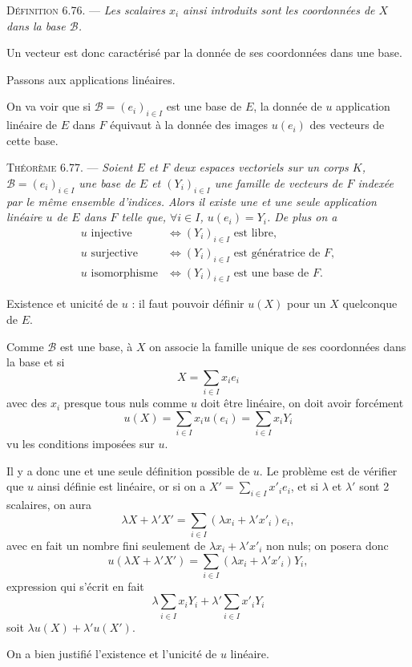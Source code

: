 \medskip\noindent\textsc{Définition 6.76.} --- \emph{Les scalaires $x_i$ ainsi introduits sont les coordonnées de $X$ dans la base $\mathcal B$.}

Un vecteur est donc caractérisé par la donnée de ses coordonnées dans une base.

Passons aux applications linéaires.

On va voir que si $\mathcal B=(e_i)_{i\in I}$ est une base de $E$, la donnée de $u$ application linéaire de $E$ dans $F$ équivaut à la donnée des images $u(e_i)$ des vecteurs de cette base.

\medskip\noindent\textsc{Théorème 6.77.} --- \emph{Soient $E$ et $F$ deux espaces vectoriels sur un corps $K$, $\mathcal B=(e_i)_{i\in I}$ une base de $E$ et $(Y_i)_{i\in I}$ une famille de vecteurs de $F$ indexée par le même ensemble d'indices. Alors il existe une et une seule application linéaire $u$ de $E$ dans $F$ telle que, $\forall i\in I$, $u(e_i)=Y_i$. De plus on a
\[
\begin{aligned}
u\text{ injective}&\Longleftrightarrow (Y_i)_{i\in I}\text{ est libre},\\
u\text{ surjective}&\Longleftrightarrow (Y_i)_{i\in I}\text{ est génératrice de }F,\\
u\text{ isomorphisme}&\Longleftrightarrow (Y_i)_{i\in I}\text{ est une base de }F.
\end{aligned}
\]}

Existence et unicité de $u$ : il faut pouvoir définir $u(X)$ pour un $X$ quelconque de $E$.

Comme $\mathcal B$ est une base, à $X$ on associe la famille unique de ses coordonnées dans la base et si
\[
X=\sum_{i\in I}x_i e_i
\]
avec des $x_i$ presque tous nuls comme $u$ doit être linéaire, on doit avoir forcément
\[
u(X)=\sum_{i\in I}x_i u(e_i)=\sum_{i\in I}x_iY_i
\]
vu les conditions imposées sur $u$.

Il y a donc une et une seule définition possible de $u$. Le problème est de vérifier que $u$ ainsi définie est linéaire, or si on a $X'=\sum_{i\in I}x'_i e_i$, et si $\lambda$ et $\lambda'$ sont 2 scalaires, on aura
\[
\lambda X+\lambda'X'=\sum_{i\in I}(\lambda x_i+\lambda' x'_i)e_i,
\]
avec en fait un nombre fini seulement de $\lambda x_i+\lambda' x'_i$ non nuls; on posera donc
\[
u(\lambda X+\lambda'X')=\sum_{i\in I}(\lambda x_i+\lambda' x'_i)Y_i,
\]
expression qui s'écrit en fait
\[
\lambda\sum_{i\in I}x_iY_i+\lambda'\sum_{i\in I}x'_iY_i
\]
soit $\lambda u(X)+\lambda'u(X')$.

On a bien justifié l'existence et l'unicité de $u$ linéaire.

